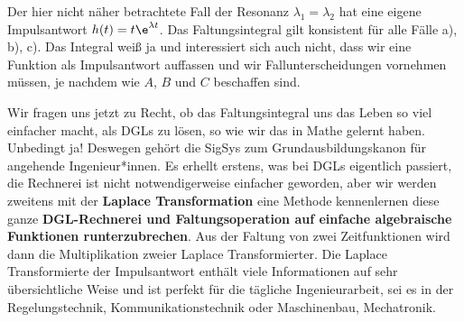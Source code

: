 Der hier nicht näher betrachtete Fall der Resonanz $\lambda_1 = \lambda_2$
hat eine eigene Impulsantwort $h(t) = t \e^{\lambda t}$.
%
Das Faltungsintegral gilt konsistent
für alle Fälle a), b), c). Das Integral weiß ja und interessiert sich auch nicht,
dass wir eine Funktion als Impulsantwort auffassen und wir Fallunterscheidungen
vornehmen müssen, je nachdem wie $A$, $B$ und $C$ beschaffen sind.

Wir fragen uns jetzt zu Recht, ob das Faltungsintegral
uns das Leben so viel einfacher macht, als DGLs zu lösen, so wie wir das in Mathe
gelernt haben.
%
Unbedingt ja! Deswegen gehört die SigSys zum Grundausbildungskanon für angehende
Ingenieur*innen.
Es erhellt erstens, was bei DGLs eigentlich passiert, die Rechnerei
ist nicht notwendigerweise einfacher geworden, aber wir werden zweitens mit der
\textbf{Laplace Transformation} eine
Methode kennenlernen diese ganze \textbf{DGL-Rechnerei und Faltungsoperation auf
einfache algebraische Funktionen runterzubrechen}. Aus der Faltung von zwei
Zeitfunktionen wird dann die Multiplikation zweier Laplace Transformierter.
%
Die Laplace Transformierte der Impulsantwort enthält viele Informationen auf
sehr übersichtliche Weise und ist perfekt für die tägliche Ingenieurarbeit, sei
es in der Regelungstechnik, Kommunikationstechnik oder Maschinenbau, Mechatronik.

\newpage
